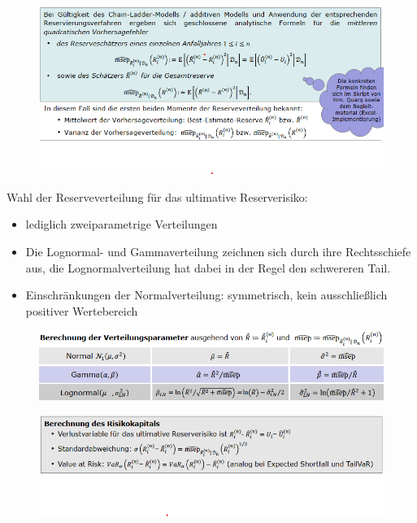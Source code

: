 \documentclass[12pt]{report}
\theoremstyle{dotless}
\theoremstyle{definition}
\begin{document}
\begin{figure}[ht]
	\centering
	\includegraphics[width= \textwidth]{Bilder/Schaetzer.png}
\end{figure}

Wahl der Reserveverteilung für das ultimative Reserverisiko:
\begin{itemize}
\item lediglich zweiparametrige Verteilungen 
\item  Die Lognormal- und Gammaverteilung zeichnen sich durch ihre Rechtsschiefe aus, die Lognormalverteilung hat dabei in der Regel den schwereren Tail.
\item Einschränkungen der Normalverteilung: symmetrisch, kein ausschließlich positiver
Wertebereich
\end{itemize}

\begin{figure}[ht]
	\centering
	\includegraphics[width= \textwidth]{Bilder/Verteilungsparameter.png}
\end{figure}

\begin{figure}
	\centering
	\includegraphics[width= \textwidth]{Bilder/Risikokapital.png}
\end{figure}
\end{document}
